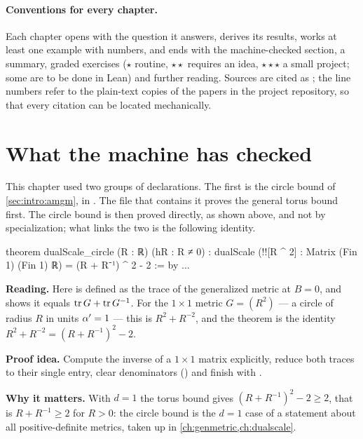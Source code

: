 \paragraph{Conventions for every chapter.} Each chapter opens with the question it answers,
derives its results, works at least one example with numbers, and ends with the
machine-checked section, a summary, graded exercises (\(\star\) routine, \(\star\star\)
requires an idea, \(\star\star\star\) a small project; some are to be done in Lean) and
further reading. Sources are cited as ; the line numbers
refer to the plain-text copies of the papers in the project repository, so that every
citation can be located mechanically.

\section{What the machine has checked}\label{sec:intro:lean}

This chapter used two groups of declarations. The first is the circle bound of
\cref{sec:intro:amgm}, in . The file that contains it proves
the general torus bound first. The circle bound is then proved directly, as shown above, and
not by specialization; what links the two is the following identity.

\begin{leanbox}
\begin{leancode}
theorem dualScale_circle (R : ℝ) (hR : R ≠ 0) :
    dualScale (!![R ^ 2] : Matrix (Fin 1) (Fin 1) ℝ)
      = (R + R⁻¹) ^ 2 - 2 := by ...
\end{leancode}
\textbf{Reading.} Here  is defined as the trace of the generalized metric at
$B=0$, and  shows it equals $\operatorname{tr} G+\operatorname{tr} G^{-1}$. For the $1\times1$ metric
$G=(R^2)$ --- a circle of radius $R$ in units $\alpha'=1$ --- this is $R^2+R^{-2}$, and the theorem
is the identity $R^2+R^{-2}=(R+R^{-1})^2-2$.

\textbf{Proof idea.} Compute the inverse of a $1\times1$ matrix explicitly, reduce both traces
to their single entry, clear denominators () and finish with .

\textbf{Why it matters.} With $d=1$ the torus bound  gives
$(R+R^{-1})^2-2\ge2$, that is $R+R^{-1}\ge2$ for $R>0$: the circle bound is the $d=1$ case of
a statement about all positive-definite metrics, taken up in \cref{ch:genmetric,ch:dualscale}.
\end{leanbox}

